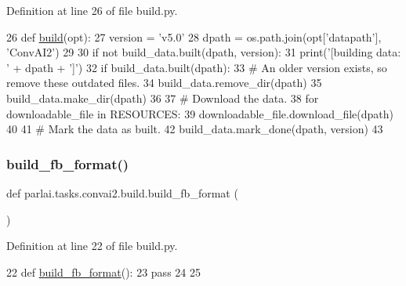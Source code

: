 Definition at line 26 of file build.\+py.


\begin{DoxyCode}
26 \textcolor{keyword}{def }\hyperlink{namespacedialog__babi__feedback_1_1build_a7a9d289f7493a5ded13c4b7f071b6184}{build}(opt):
27     version = \textcolor{stringliteral}{'v5.0'}
28     dpath = os.path.join(opt[\textcolor{stringliteral}{'datapath'}], \textcolor{stringliteral}{'ConvAI2'})
29 
30     \textcolor{keywordflow}{if} \textcolor{keywordflow}{not} build\_data.built(dpath, version):
31         print(\textcolor{stringliteral}{'[building data: '} + dpath + \textcolor{stringliteral}{']'})
32         \textcolor{keywordflow}{if} build\_data.built(dpath):
33             \textcolor{comment}{# An older version exists, so remove these outdated files.}
34             build\_data.remove\_dir(dpath)
35         build\_data.make\_dir(dpath)
36 
37         \textcolor{comment}{# Download the data.}
38         \textcolor{keywordflow}{for} downloadable\_file \textcolor{keywordflow}{in} RESOURCES:
39             downloadable\_file.download\_file(dpath)
40 
41         \textcolor{comment}{# Mark the data as built.}
42         build\_data.mark\_done(dpath, version)
43 \end{DoxyCode}
\mbox{\label{namespaceparlai_1_1tasks_1_1convai2_1_1build_aac893ef8d5159621bc7086097270f7c1}} 
\subsubsection{\texorpdfstring{build\+\_\+fb\+\_\+format()}{build\_fb\_format()}}
{\footnotesize\ttfamily def parlai.\+tasks.\+convai2.\+build.\+build\+\_\+fb\+\_\+format (\begin{DoxyParamCaption}{ }\end{DoxyParamCaption})}



Definition at line 22 of file build.\+py.


\begin{DoxyCode}
22 \textcolor{keyword}{def }\hyperlink{namespaceparlai_1_1tasks_1_1convai2_1_1build_aac893ef8d5159621bc7086097270f7c1}{build\_fb\_format}():
23     \textcolor{keywordflow}{pass}
24 
25 
\end{DoxyCode}


